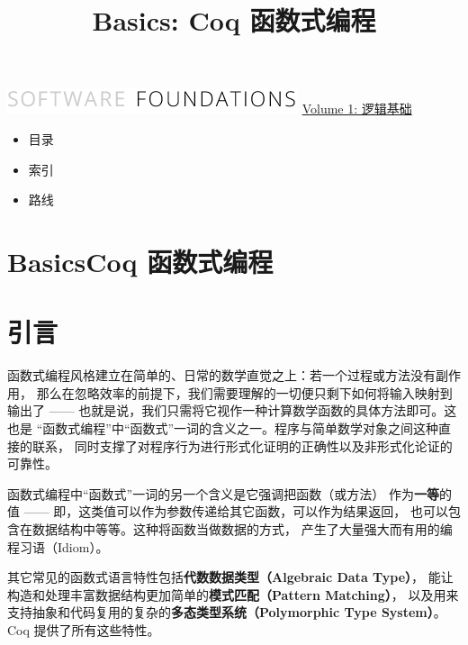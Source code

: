 \documentclass[utf8]{ctexart}
\title{Basics: Coq 函数式编程}
\date{}
\providecommand{\tightlist}{%
  \setlength{\itemsep}{0pt}\setlength{\parskip}{0pt}}
\begin{document}
\maketitle

\hypertarget{page}{}
\hypertarget{header}{}
\href{https://coq-zh.github.io/SF-zh/index.html}{\includegraphics{common/media/image/sf_logo_sm.png}}
\href{index.html}{{Volume 1: 逻辑基础}\\
}

\begin{itemize}
\tightlist
\item
  目录
\item
  索引
\item
  路线
\end{itemize}

\hypertarget{main}{}
\hypertarget{basicscoq-ux51fdux6570ux5f0fux7f16ux7a0b}{%
\section{\texorpdfstring{Basics{Coq
函数式编程}}{BasicsCoq 函数式编程}}\label{basicscoq-ux51fdux6570ux5f0fux7f16ux7a0b}}

\protect\hypertarget{lab18}{}{}

\hypertarget{ux5f15ux8a00}{%
\section{引言}\label{ux5f15ux8a00}}

函数式编程风格建立在简单的、日常的数学直觉之上：若一个过程或方法没有副作用，
那么在忽略效率的前提下，我们需要理解的一切便只剩下如何将输入映射到输出了
------ 也就是说，我们只需将它视作一种计算数学函数的具体方法即可。这也是
``函数式编程''中``函数式''一词的含义之一。程序与简单数学对象之间这种直接的联系，
同时支撑了对程序行为进行形式化证明的正确性以及非形式化论证的可靠性。

函数式编程中``函数式''一词的另一个含义是它强调把函数（或方法）
作为\textbf{一等}的值 ------
即，这类值可以作为参数传递给其它函数，可以作为结果返回，
也可以包含在数据结构中等等。这种将函数当做数据的方式，
产生了大量强大而有用的编程习语（Idiom）。

其它常见的函数式语言特性包括\textbf{代数数据类型（Algebraic Data
Type）}， 能让构造和处理丰富数据结构更加简单的\textbf{模式匹配（Pattern
Matching）}，
以及用来支持抽象和代码复用的复杂的\textbf{多态类型系统（Polymorphic Type
System）}。 Coq 提供了所有这些特性。
\end{document}
